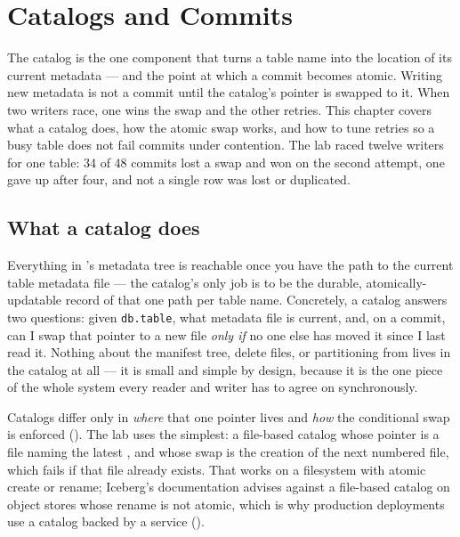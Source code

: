 \chapter{Catalogs and Commits}
\label{ch:catalogs}

\begin{chapterintro}
The catalog is the one component that turns a table name into the location of its
current metadata --- and the point at which a commit becomes atomic. Writing new
metadata is not a commit until the catalog's pointer is swapped to it. When two
writers race, one wins the swap and the other retries. This chapter covers what
a catalog does, how the atomic swap works, and how to
tune retries so a busy table does not fail commits under contention. The
lab raced twelve writers for one table: 34 of 48 commits lost a swap and won on
the second attempt, one gave up after four, and not a single row was lost or
duplicated.
\end{chapterintro}

\section{What a catalog does}
\label{sec:cat-what}

Everything in 's metadata tree is reachable once you have
the path to the current table metadata file --- the catalog's only job is to
be the durable, atomically-updatable record of that one path per table name.
Concretely, a catalog answers two questions: given \texttt{db.table}, what
metadata file is current, and, on a commit, can I swap that pointer to a new
file \emph{only if} no one else has moved it since I last read it. Nothing
about the manifest tree, delete files, or partitioning from
 lives in the catalog at all --- it is small and simple
by design, because it is the one piece of the whole system every reader and
writer has to agree on synchronously.

Catalogs differ only in \emph{where} that one pointer lives and \emph{how} the
conditional swap is enforced (). The lab uses
the simplest: a file-based catalog whose pointer is a 
file naming the latest , and whose swap is the creation
of the next numbered file, which fails if that file already exists. That
works on a filesystem with atomic create or rename; Iceberg's documentation
advises against a file-based catalog on object stores whose rename is not atomic,
which is why production deployments use a catalog backed by a service
().

